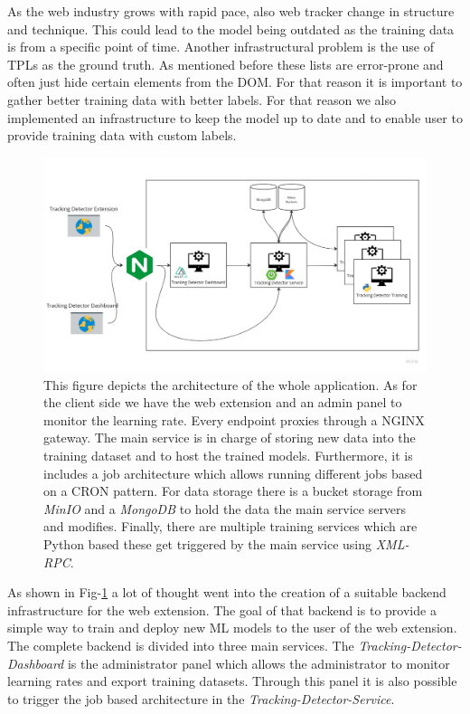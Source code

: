 As the web industry grows with rapid pace, also web tracker change in structure and technique. This could lead to the model being 
outdated as the training data is from a specific point of time. Another infrastructural problem is the use of TPLs as the ground truth. As mentioned
before these lists are error-prone and often just hide certain elements from the DOM. For that reason it is important to gather better 
training data with better labels. For that reason we also implemented an infrastructure to keep the model up to date and to enable user to
provide training data with custom labels.
\begin{figure}
  \begin{center}
    \includegraphics[width=1\textwidth]{images/TrackingDetectorInfra.jpg}
  \end{center}
  \caption{This figure depicts the architecture of the whole application. As for the client side we have the web extension and an admin panel to 
  monitor the learning rate. Every endpoint proxies through a NGINX gateway. The main service is in charge of storing new data into the training dataset and 
  to host the trained models. Furthermore, it is includes a job architecture which allows running different jobs based on a CRON pattern. For data storage there is 
  a bucket storage from \emph{MinIO} and a \emph{MongoDB} to hold the data the main service servers and modifies. Finally, there are multiple training services which are Python based
  these get triggered by the main service using \emph{XML-RPC}.
  }
  \label{fig:tdInfra}
\end{figure}

As shown in Fig-\ref{fig:tdInfra} a lot of thought went into the creation of a suitable backend infrastructure for the web extension. The goal of that
backend is to provide a simple way to train and deploy new ML models to the user of the web extension. The complete backend is divided into
three main services. The \emph{Tracking-Detector-Dashboard} is the administrator panel which allows the administrator to monitor learning rates and export 
training datasets. Through this panel it is also possible to trigger the job based architecture in the \emph{Tracking-Detector-Service}.

